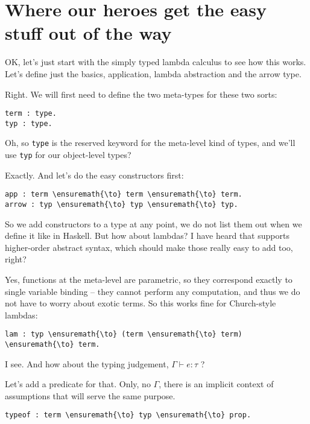 \section{Where our heroes get the easy stuff out of the
way}\label{where-our-heroes-get-the-easy-stuff-out-of-the-way}

 OK, let's just start with the simply typed lambda calculus to
see how this works. Let's define just the basics, application, lambda
abstraction and the arrow type.

 Right. We will first need to define the two meta-types for
these two sorts:

\begin{verbatim}
term : type.
typ : type.
\end{verbatim}

 Oh, so \texttt{type} is the reserved keyword for the meta-level
kind of types, and we'll use \texttt{typ} for our object-level types?

 Exactly. And let's do the easy constructors first:

\begin{verbatim}
app : term \ensuremath{\to} term \ensuremath{\to} term.
arrow : typ \ensuremath{\to} typ \ensuremath{\to} typ.
\end{verbatim}

 So we add constructors to a type at any point, we do not list
them out when we define it like in Haskell. But how about lambdas? I
have heard that \lamprolog supports higher-order abstract syntax, which
should make those really easy to add too, right?

 Yes, functions at the meta-level are parametric, so they
correspond exactly to single variable binding -- they cannot perform any
computation, and thus we do not have to worry about exotic terms. So
this works fine for Church-style lambdas:

\begin{verbatim}
lam : typ \ensuremath{\to} (term \ensuremath{\to} term) \ensuremath{\to} term.
\end{verbatim}

 I see. And how about the typing judgement,
\(\Gamma \vdash e : \tau\) ?

 Let's add a predicate for that. Only, no \(\Gamma\), there is
an implicit context of assumptions that will serve the same purpose.

\begin{verbatim}
typeof : term \ensuremath{\to} typ \ensuremath{\to} prop.
\end{verbatim}


